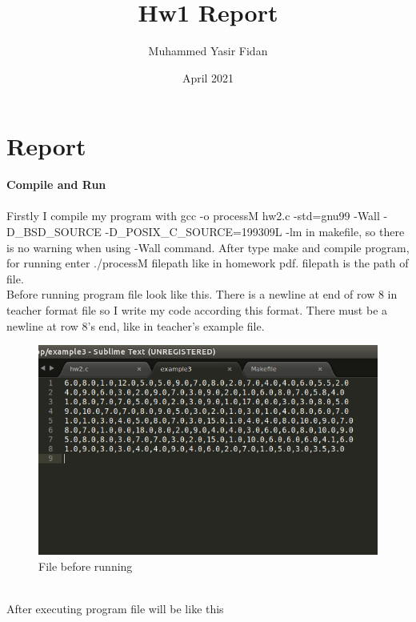 \documentclass{article}
\title{Hw1 Report}
\author{Muhammed Yasir Fidan }
\date{April 2021}
\begin{document}
\maketitle

\section{Report}
\textbf{Compile and Run} \\
\\
Firstly I compile my program with gcc -o processM hw2.c -std=gnu99 -Wall -D\_BSD\_SOURCE -D\_POSIX\_C\_SOURCE=199309L -lm in makefile, so there is no warning when using -Wall command. After type make and compile program, for running enter ./processM filepath like in homework pdf. filepath is the path of file.
\\
Before running program file look like this. There is a newline at end of row 8 in teacher format file so I write my code according this format. There must be a newline at row 8's end, like in teacher's example file.
\begin{figure}[h!]
\centering
\includegraphics[scale=0.6]{ss1.png}
\caption{File before running}
\label{fig:ss1.png}
\end{figure}

\\
After executing program file will be like this
\end{document}
